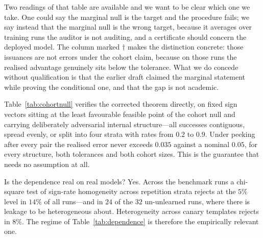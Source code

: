 Two readings of that table are available and we want to be clear which one we take.
One could say the marginal null is the target and the procedure fails; we say instead
that the marginal null is the wrong target, because it averages over training runs the
auditor is not auditing, and a certificate should concern the deployed model. The
column marked $\dagger$ makes the distinction concrete: those issuances are not errors
under the cohort claim, because on those runs the realised advantage genuinely sits
below the tolerance. What we do concede without qualification is that the earlier
draft claimed the marginal statement while proving the conditional one, and that the
gap is not academic.

Table~\ref{tab:cohortnull} verifies the corrected theorem directly, on fixed sign
vectors sitting at the least favourable feasible point of the cohort null and carrying
deliberately adversarial internal structure---all successes contiguous, spread evenly,
or split into four strata with rates from $0.2$ to $0.9$. Under peeking after every
pair the realised error never exceeds $0.035$ against a nominal $0.05$, for every
structure, both tolerances and both cohort sizes. This is the guarantee that needs no
assumption at all.

Is the dependence real on real models? Yes. Across the benchmark runs a chi-square test
of sign-rate homogeneity across repetition strata rejects at the $5\%$ level in $14\%$
of all runs---and in $24$ of the $32$ un-unlearned runs, where there is leakage to be
heterogeneous about. Heterogeneity across canary templates rejects in $8\%$. The
regime of Table~\ref{tab:dependence} is therefore the empirically relevant one.

\begin{table}[t]
\centering\small
\caption{Which null is controlled. Sign streams with \emph{marginal} mean
$p_0 = 0.55$ ($\eps = 0.1$), $1{,}024$ pairs, $2{,}000$ seeds, peeking after every
pair. ``marginal'' is the issuance rate under the marginal null; ``cohort'' restricts
to runs whose realised cohort advantage genuinely violates the tolerance, the event
Theorem~\ref{thm:cert} controls. Bold marks a breach of $\alpha = 0.05$.
$^{\dagger}$These issuances are not errors under the cohort claim.}
\label{tab:dependence}

\end{table}

\begin{table}[t]
\centering\small
\caption{Direct verification of Theorem~\ref{thm:cert}: realised type-I error on fixed
sign vectors at the least favourable feasible point of the cohort null, revealed in a
uniformly random order with peeking after every pair ($2{,}000$ seeds,
$\alpha = 0.05$). ``ours'' is the without-replacement process, ``fixed'' the
fixed-boundary one.}
\label{tab:cohortnull}

\end{table}


